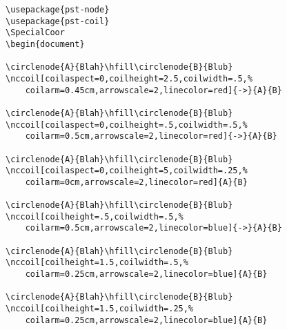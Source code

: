 \documentclass[a4paper]{article}
\begin{document}
\hfill{}

\hfill{}

\hfill{}

\hfill{}

\hfill{}

\hfill{}


\begin{verbatim}
\usepackage{pst-node}
\usepackage{pst-coil}
\SpecialCoor
\begin{document}

\circlenode{A}{Blah}\hfill\circlenode{B}{Blub}
\nccoil[coilaspect=0,coilheight=2.5,coilwidth=.5,%
	coilarm=0.45cm,arrowscale=2,linecolor=red]{->}{A}{B}

\circlenode{A}{Blah}\hfill\circlenode{B}{Blub}
\nccoil[coilaspect=0,coilheight=.5,coilwidth=.5,%
	coilarm=0.5cm,arrowscale=2,linecolor=red]{->}{A}{B}

\circlenode{A}{Blah}\hfill\circlenode{B}{Blub}
\nccoil[coilaspect=0,coilheight=5,coilwidth=.25,%
	coilarm=0cm,arrowscale=2,linecolor=red]{A}{B}

\circlenode{A}{Blah}\hfill\circlenode{B}{Blub}
\nccoil[coilheight=.5,coilwidth=.5,%
	coilarm=0.5cm,arrowscale=2,linecolor=blue]{->}{A}{B}

\circlenode{A}{Blah}\hfill\circlenode{B}{Blub}
\nccoil[coilheight=1.5,coilwidth=.5,%
	coilarm=0.25cm,arrowscale=2,linecolor=blue]{A}{B}

\circlenode{A}{Blah}\hfill\circlenode{B}{Blub}
\nccoil[coilheight=1.5,coilwidth=.25,%
	coilarm=0.25cm,arrowscale=2,linecolor=blue]{A}{B}
\end{verbatim}
\end{document}
